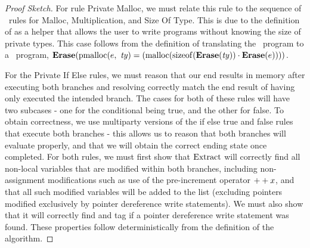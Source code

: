 \begin{proof}[Proof Sketch]
For rule Private Malloc, we must relate this rule to the sequence of \vanillaC\ rules for Malloc, Multiplication, and Size Of Type. This is due to the definition of  as a helper that allows the user to write programs without knowing the size of private types. This case follows from the definition of translating the \piccoC\ program to a \vanillaC\ program, $\bm{\mathrm{Erase}}({\mathrm{pmalloc}(e,\ \mathit{ty})} 
= {(\mathrm{malloc}(\mathrm{sizeof}(\bm{\mathrm{Erase}}(\mathit{ty})) \cdot \bm{\mathrm{Erase}}(e)))})$.

For the Private If Else rules, we must reason that our end results in memory after executing both branches and resolving correctly match the end result of having only executed the intended branch. 
The cases for both of these rules will have two subcases - one for the conditional being true, and the other for false. 
To obtain correctness, we use multiparty versions of the if else true and false rules that execute both branches - this allows us to reason that both branches will evaluate properly, and that we will obtain the correct ending state once completed. 
For both rules, we must first show that $\mathrm{ Extract}$ will correctly find all non-local variables that are modified within both branches, including non-assignment modifications such as use of the pre-increment operator $++x$, and that all such modified variables will be added to the list (excluding pointers modified exclusively by pointer dereference write statements). We must also show that it will correctly find and tag if a pointer dereference write statement was found. These properties follow deterministically from the definition of the algorithm. 


\end{proof}
